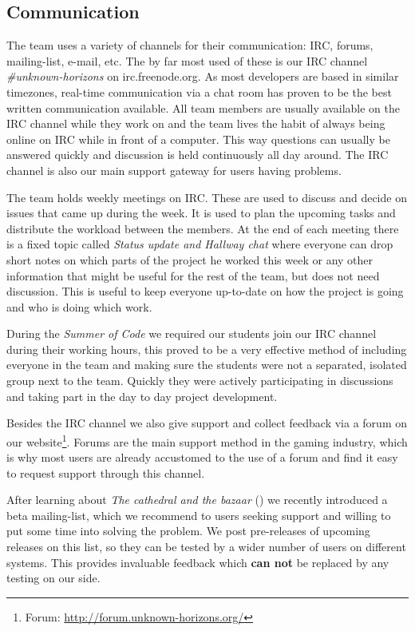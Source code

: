 \subsection{Communication}
The team uses a variety of channels for their communication: IRC, forums, mailing-list, e-mail, etc. 
The by far most used of
these is our IRC channel \textit{\#unknown-horizons} on irc.freenode.org. As most developers are based in similar
timezones, real-time communication via a chat room has proven to be the best written communication available. All team members are
usually available on the IRC channel while they work on \UH{} and the team lives the habit of always being online on
IRC while in front of a computer. This way questions can usually be answered quickly and discussion is held continuously
all day around. The IRC channel is also our main support gateway for users having problems.

The team holds weekly meetings on IRC. These are used to discuss and decide on issues that came up during the week. It is
used to plan the upcoming tasks and distribute the workload between the members. At the end of each meeting there is a
fixed topic called \textit{Status update and Hallway chat} where everyone can drop short notes on which parts of the
project he worked this week or any other information that might be useful for the rest of the team, but does not need
discussion. This is useful to keep everyone up-to-date on how the project is going and who is doing which work.

During the \textit{Summer of Code} we required our students join our IRC channel during their working hours, this proved
to be a very effective method of including everyone in the team and making sure the students were not a separated,
isolated group next to the team. Quickly they were actively participating in discussions and taking part in the day to
day project development.

Besides the IRC channel we also give support and collect feedback via a forum on our website\footnote{\UH{} Forum:
\url{http://forum.unknown-horizons.org/}}. Forums are the main support method in the gaming industry, which is why most
users are already accustomed to the use of a forum and find it easy to request support through this channel.

After learning about \textit{The cathedral and the bazaar} (\cite{springerlink:10.1007/s12130-999-1026-0}) we recently
introduced a beta mailing-list, which we recommend to users seeking support and willing to put some time into
solving the problem. We post pre-releases of upcoming releases on this list, so they can be tested by a wider number
of users on different systems. This provides invaluable feedback which \textbf{can not} be replaced by any testing on our side.

